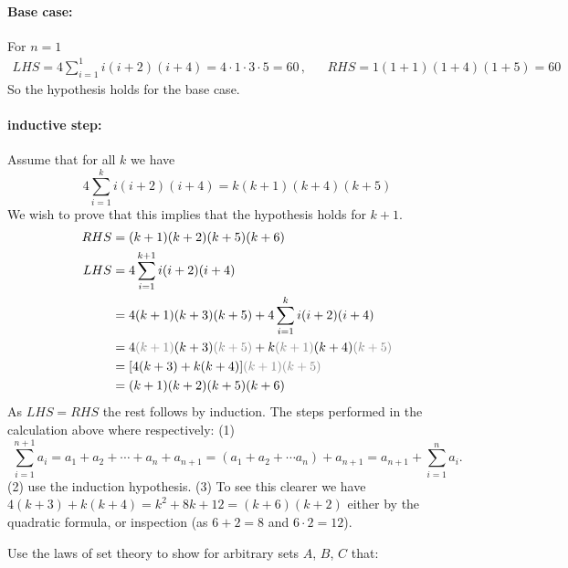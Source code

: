 \documentclass[a4paper, english, 12pt]{article} %
\begin{document}
\begin{answer}
  \paragraph{Base case:} For $n=1$
  \begin{align*}
    LHS = 4 \sum_{i=1}^{1} i(i+2)(i+4) = 4\cdot 1 \cdot 3 \cdot 5 = 60\,,
    && RHS = 1(1+1)(1+4)(1+5) = 60
  \end{align*}
  So the hypothesis holds for the base case.
  \paragraph{inductive step:} Assume that for all $k$ we have
  \begin{equation*}
    4 \sum_{i=1}^k i(i+2)(i+4) = k(k+1)(k+4)(k+5)
  \end{equation*}
  We wish to prove that this implies that the hypothesis holds for $k+1$.
  \begin{align*}
    RHS & = (k+1)(k+2)(k+5)(k+6) \\
    LHS & = 4 \sum_{i = 1}^{k+1} i(i+2)(i+4) \\
        & = 4 (k+1)(k+3)(k+5) + 4 \sum_{i=1}^{k} i(i+2)(i+4) \\
        & = 4 \textcolor{gray}{(k+1)}(k+3)\textcolor{gray}{(k+5)} + k\textcolor{gray}{(k+1)}(k+4)\textcolor{gray}{(k+5)} \\
        & = [4(k+3) + k(k+4)]\textcolor{gray}{(k+1)(k+5)} \\
        & = (k+1)(k+2)(k+5)(k+6)
  \end{align*}
  As $LHS = RHS$ the rest follows by induction. The steps performed in the
  calculation above where respectively: (1)
  \begin{equation*}
    \sum_{i=1}^{n+1} a_i = a_1 + a_2 + \cdots + a_{n} + a_{n+1}
    = ( a_1 + a_2 + \cdots a_{n} ) + a_{n+1}
    = a_{n+1} + \sum_{i = 1}^{n} a_i.
  \end{equation*}
  (2) use the induction hypothesis. (3) To see this clearer we
  have $4(k+3) + k(k+4) = k^2 + 8k + 12 = (k+6)(k+2)$ either by the quadratic
  formula, or inspection (as $6+2 = 8$ and $6\cdot 2 = 12$).
\end{answer}
  

\begin{problem}[7]
  Use the laws of set theory to show for arbitrary sets $A$, $B$, $C$ that:
\end{problem}
\end{document}
